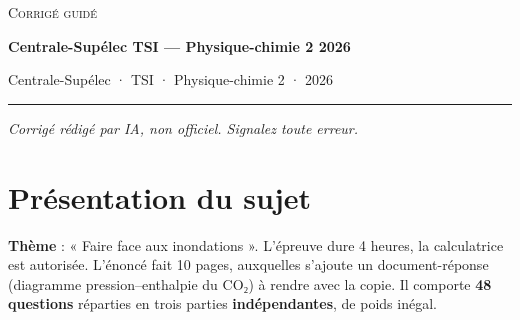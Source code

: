 \documentclass[11pt,a4paper]{article}
\begin{document}
\thispagestyle{plain}
\begin{center}
  {\small\scshape Corrigé guidé}\par\smallskip
  {\LARGE\bfseries Centrale-Supélec TSI — Physique-chimie 2 2026\par}\medskip
  {\large Centrale-Supélec · TSI · Physique-chimie 2 · 2026\par}
\end{center}
\vspace{2pt}\hrule\vspace{8pt}

\emph{Corrigé rédigé par IA, non officiel. Signalez toute erreur.}

\hypertarget{pruxe9sentation-du-sujet}{%
\section{Présentation du sujet}\label{pruxe9sentation-du-sujet}}

\textbf{Thème} : « Faire face aux inondations ». L'épreuve dure 4 heures, la calculatrice est autorisée. L'énoncé fait 10 pages, auxquelles s'ajoute un document-réponse (diagramme pression--enthalpie du CO₂) à rendre avec la copie. Il comporte \textbf{48 questions} réparties en trois parties \textbf{indépendantes}, de poids inégal.
\end{document}

